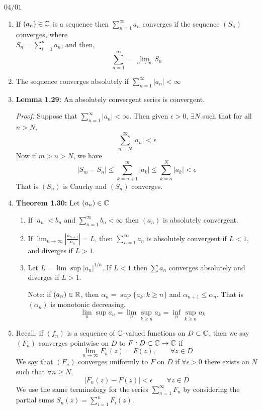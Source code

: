 \documentclass[12pt]{article}
\begin{document}
\newpage 

$04/01$

\begin{enumerate}
    \item If $(a_n) \in \mathbb C$ is a sequence then $\sum_{n=1}^\infty a_n$ converges if the sequence $(S_n)$ converges, where  \\$S_n = \sum_{i=1}^n a_n$, and then, 
    \[\sum_{n=1}^\infty = \lim_{n\to \infty} S_n\]
    \item The sequence converges absolutely if $\sum_{n=1}^\infty |a_n| < \infty$
    \item \textbf{Lemma 1.29:} An absolutely convergent series is convergent.
    
    \textit{Proof:} Suppose that $\sum_{n=1}^\infty |a_n| <\infty$. Then given $\epsilon > 0$, $\exists N$ such that for all $n > N$, 
    \[\sum_{n=N}^\infty |a_n| < \epsilon\]
    Now if $m > n > N$, we have 
    \[|S_m - S_n| \leq \sum_{k=n+1}^m |a_k| \leq \sum_{k=n}^N|a_k| <\epsilon\]
    That is $(S_n)$ is Cauchy and $(S_n)$ converges. 
    \item \textbf{Theorem 1.30:} Let $(a_n) \in \mathbb C$ 
    \begin{enumerate}
        \item If $|a_n| < b_n$ and $\sum_{n=1}^\infty b_n < \infty$ then $(a_n)$ is absolutely convergent. 
        \item If $\lim_{n\to \infty} \left|\frac{a_{n+1}}{a_n}\right| = L$, then $\sum_{n=1}^\infty a_n$ is absolutely convergent if $L < 1$, and diverges if $L > 1$. 
        \item Let $L = \lim \sup |a_n| ^{1/n}$. If $L < 1$ then $\sum a_n$ converges absolutely and diverges if $L > 1$. 
        
        Note: if $(a_n) \in \mathbb R$, then $\alpha_n = \sup \{a_k : k \geq n\}$ and $\alpha_{n+1} \leq \alpha_n$. That is $(\alpha_n)$ is monotonic decreasing. 
        \[\lim_n \sup a_n = \lim_n \sup_{k \geq n} a_k = \inf_n \sup_{k \geq n} a_k\]
    \end{enumerate}

    \item Recall, if $(f_n)$ is a sequence of $\mathbb C$-valued functions on $D \subset \mathbb C$, then we say $(F_n)$ converges pointwise on $D$ to $F: D \subset \mathbb C \to \mathbb C$ if 
    \[\lim_{n\to \infty} F_n(z) = F(z), \qquad \forall z \in D\]
    We say that $(F_n)$ converges uniformly to $F$ on $D$ if $\forall \epsilon > 0$ there exists an $N$ such that $\forall n \geq N$, 
    \[|F_n(z) - F(z)| < \epsilon \qquad \forall z \in D\]
    We use the same terminology for the series $\sum_{n=1}^\infty F_n$ by considering the partial sums $S_n (z) = \sum_{i=1}^n F_i (z)$. 


\end{enumerate}
\end{document}
